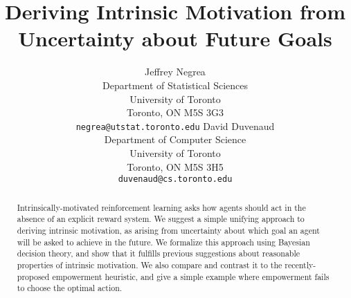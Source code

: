 \documentclass{article}
\title{Deriving Intrinsic Motivation from \\ Uncertainty about Future Goals}
\author{
 Jeffrey Negrea\\
 Department of Statistical Sciences\\
 University of Toronto\\
 Toronto, ON M5S 3G3\\
 \texttt{negrea@utstat.toronto.edu}
 \And
 David Duvenaud\\
 Department of Computer Science\\
 University of Toronto\\
 Toronto, ON M5S 3H5\\
 \texttt{duvenaud@cs.toronto.edu}
}
\begin{document}
\maketitle

\begin{abstract}
Intrinsically-motivated reinforcement learning asks how agents should act in the absence of an explicit reward system. 
We suggest a simple unifying approach to deriving intrinsic motivation, as arising from uncertainty about which goal an agent will be asked to achieve in the future.
We formalize this approach using Bayesian decision theory, and show that it fulfills previous suggestions about reasonable properties of intrinsic motivation. 
We also compare and contrast it to the recently-proposed empowerment heuristic, and give a simple example where empowerment fails to choose the optimal action.
\end{abstract}
\end{document}
